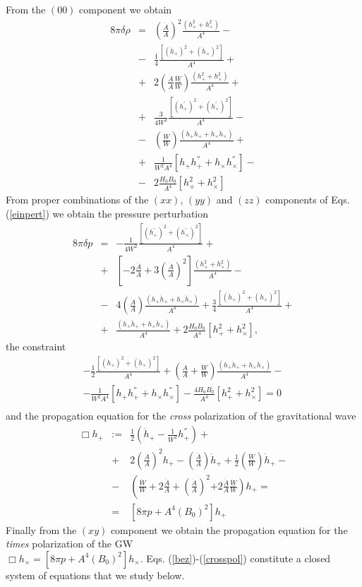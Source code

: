 \documentclass[prd,twocolumn,showpacs,preprintnumbers,amsmath,amssy mb]{revtex4}
\newcommand{\bea}{\begin{eqnarray}}
\newcommand{\eea}{\end{eqnarray}}
\newcommand{\nn}{\nonumber}
\begin{document}
From the $(00)$ component we obtain 
\bea 
\label{denspert}
8\pi \delta \rho &=&\left(\frac{\dot{A}}{A}\right)^{2}
\frac{(h_{+}^{2}+h_{\times }^{2})}{A^{4}}-\nn \\
&-&\frac{1}{4}
\frac{[(\dot{h}_{+})^{2}+(\dot{h}_{\times })^{2}]}{A^{4}}
+\nn \\&+&2\left(\frac{\dot{A}}{A}\frac{\dot{W}}{W}\right)
\frac{(h_{+}^{2}+h_{\times }^{2})}{A^{4}}+\nn \\
&+&\frac{3}{4W^{2}}
\frac{[(h_{+}^{'})^{2}+(h_{\times }^{'})^{2}]}{A^{4}}-
\nn \\ &-&\left(\frac{\dot{W}}{W}\right)
\frac{(h_{+}\dot{h}_{+}+h_{\times }\dot{h}_{\times })}{A^{4}}+
\nn \\&+&\frac{1}{W^{2}A^{4}}[h_{+}h_{+}^{''}+h_{\times }h_{\times }^{''}]
-\nn \\&-&2\frac{H_{0}B_{0}}{A^{4}}[h_{+}^{2}+h_{\times }^{2}]
\eea
From proper combinations of the $(xx)$, $(yy)$ and $(zz)$ components 
of Eqs. (\ref{einpert}) we obtain the pressure perturbation
\bea
\label{pressu} 
8\pi \delta p&=&-\frac{1}{4W^{2}}
\frac{[(h_{+}^{'})^{2}+(h_{\times }^{'})^{2}]}{A^{4}}+\nn \\&+&
\left[-2\frac{\ddot{A}}{A}+3\left(\frac{\dot{A}}{A}\right)^{2}\right]
\frac{(h_{+}^{2}+h_{\times }^{2})}{A^{4}}-\nn \\&-&
4\left(\frac{\dot{A}}{A}\right)
\frac{(h_{+}\dot{h}_{+}+h_{\times }\dot{h}_{\times })}{A^{4}}
+\frac{3}{4}\frac{[(\dot{h}_{+})^{2}+(\dot{h}_{\times })^{2}]}{A^{4}}+
\nn \\&+&
\frac{(h_{+}\ddot{h}_{+}+h_{\times }\ddot{h}_{\times })}{A^{4}}
+2\frac{H_{0}B_{0}}{A^{4}}[h_{+}^{2}+h_{\times }^{2}],
\eea
the constraint 
\bea 
\label{constr}
-\frac{1}{2}\frac{[(\dot{h}_{+})^{2}+(\dot{h}_{\times })^{2}]}{A^{4}}
+\left(\frac{\dot{A}}{A}+\frac{\dot{W}}{W}\right)
\frac{(h_{+}\dot{h}_{+}+h_{\times }\dot{h}_{\times })}{A^{4}}-\nn \\
-\frac{1}{W^{2}A^{4}}[h_{+}h_{+}^{''}+h_{\times }h_{\times }^{''}]
-\frac{4H_{0}B_{0}}{A^{4}}[h_{+}^{2}+h_{\times }^{2}]=0\nn \\
\eea
and the propagation equation for the {\it cross} 
polarization of the gravitational wave
\bea 
\label{crosspol}
\Box h_{+}&:=&\frac{1}{2}\left(\ddot{h}_{+}-\frac{1}{W^{2}}h_{+}^{''}\right)
+\nn \\&+& 2\left(\frac{\dot{A}}{A}\right)^{2}h_{+}-
\left(\frac{\dot{A}}{A}\right)\dot{h}_{+}+
\frac{1}{2}\left(\frac{\dot{W}}{W}\right)\dot{h}_{+}-\nn \\
&-&\left(\frac{\ddot{W}}{W}+2\frac{\ddot{A}}{A}+\left(\frac{\dot{A}}{A}\right)^{2}\right.
\left.+2\frac{\dot{A}}{A}\frac{\dot{W}}{W}\right)h_{+}=\nn \\
&=&[8\pi p+A^{4}(B_{0})^{2}]h_{+}
\eea
Finally from the $(xy)$ component we obtain the propagation equation 
for the {\it times} polarization of the GW\\
$\Box h_{\times }=[8\pi p+A^{4}(B_{0})^{2}]h_{\times }$. 
Eqs. (\ref{bez})-(\ref{crosspol}) constitute a closed system 
of equations that we study below. 
\end{document}
